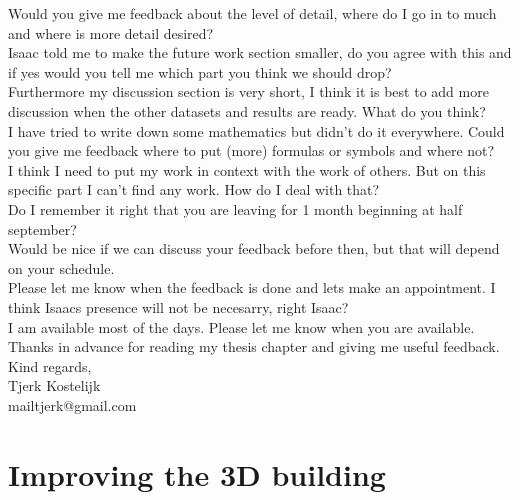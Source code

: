 Would you give me feedback about the level of detail, where do I go in to much and where is more detail desired?\\
Isaac told me to make the future work section smaller, do you agree with this and if yes would you tell me which part you think we should drop?\\
Furthermore my discussion section is very short, I think it is best to add more discussion when the other datasets and results are ready. What do you think?\\
I have tried to write down some mathematics but didn't do it everywhere. Could you give me feedback where to put (more) formulas or symbols and where not?\\
I think I need to put my work in context with the work of others. But on this specific part I can't find any work. How do I deal with that?\\
Do I remember it right that you are leaving for 1 month beginning at half september?\\
Would be nice if we can discuss your feedback before then, but that will depend on your schedule.\\
Please let me know when the feedback is done and lets make an appointment. I think Isaacs presence will not be necesarry, right Isaac?\\
I am available most of the days. Please let me know when you are available.\\

Thanks in advance for reading my thesis chapter and giving me useful feedback.\\

Kind regards,\\
Tjerk Kostelijk\\
mailtjerk@gmail.com
 
\section{Improving the 3D building}
